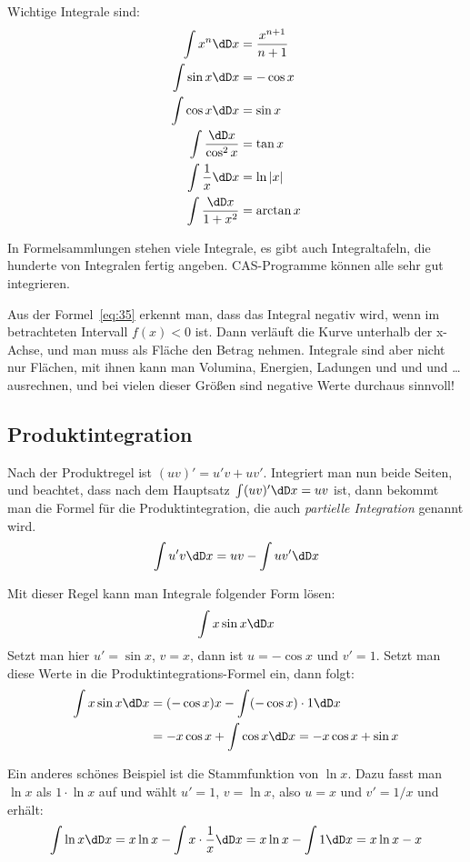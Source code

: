 Wichtige Integrale sind:
\begin{align}
  \label{eq:36}
  \int x^n\dD x&=\frac{x^{n+1}}{n+1}\\
  \int\sin x\dD x&= -\cos x\label{eq:37}\\
  \int\cos x\dD x&= \sin x\label{eq:38}\\
  \int\frac{\dD x}{\cos^2x}&= \tan x\label{eq:39}\\
  \int\frac{1}{x}\dD x&= \ln|x|\label{eq:40}\\
  \int\frac{\dD x}{1+x^2}&= \arctan x\label{eq:41}
\end{align}

In Formelsammlungen stehen viele Integrale, es gibt auch Integraltafeln, die
hunderte von Integralen fertig angeben. CAS-Programme können alle sehr gut
integrieren.

Aus der Formel~\eqref{eq:35} erkennt man, dass das Integral negativ wird, wenn
im betrachteten Intervall $f(x)<0$ ist. Dann verläuft die Kurve unterhalb der
x-Achse, und man muss als Fläche den Betrag nehmen. Integrale sind aber nicht
nur Flächen, mit ihnen kann man Volumina, Energien, Ladungen und und und
\ldots ausrechnen, und bei vielen dieser Größen sind negative Werte durchaus
sinnvoll!

\subsection{Produktintegration}
Nach der Produktregel ist $(uv)'=u'v+uv'$. Integriert man nun beide Seiten,
und beachtet, dass nach dem Hauptsatz $\int (uv)'\dD x=uv$ ist, dann bekommt
man die Formel für die Produktintegration, die auch \emph{partielle
  Integration} genannt wird.
\begin{equation}
  \label{eq:42}
  \int u'v\dD x= uv - \int uv'\dD x
\end{equation}

Mit dieser Regel kann man \zB Integrale folgender Form lösen:
\[
\int x\sin x\dD x
\]
Setzt man hier $u'=\sin x$, $v=x$, dann ist $u=-\cos x$ und $v'=1$. Setzt man
diese Werte in die Produktintegrations-Formel ein, dann folgt:
\begin{align*}
\int x\sin x\dD x&= (-\cos x)x-\int (-\cos x)\cdot1\dD x\\
&=-x\cos x+\int\cos x\dD x= -x\cos x+\sin x
\end{align*}

Ein anderes schönes Beispiel ist die Stammfunktion von $\ln x$. Dazu fasst man
$\ln x$ als $1\cdot\ln x$ auf und wählt $u'=1$, $v=\ln x$, also $u=x$ und
$v'=1/x$ und erhält:
\[
\int\ln x\dD x=x\ln x-\int x\cdot\frac{1}{x}\dD x=
x\ln x-\int 1\dD x=x\ln x -x
\]

